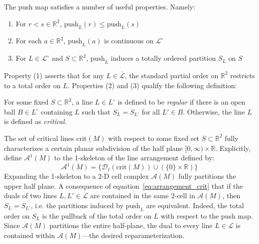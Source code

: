 \documentclass{siamart190516}
\begin{document}
The push map satisfies a number of useful properties. Namely: 
\begin{enumerate}
	\item For $r < s \in \mathbb{R}^2$, $\mathrm{push}_L(r) \leq \mathrm{push}_L(s)$
	\item For each $a \in \mathbb{R}^2$, $\mathrm{push}_L(a)$ is continuous on $\mathcal{L}^\circ$
	\item For $L \in \mathcal{L}^\circ$ and $S \subset \mathbb{R}^2$, $\mathrm{push}_L$ induces a totally ordered partition $S_L$ on $S$ 
\end{enumerate}
Property (1) asserts that for any $L \in \overline{\mathcal{L}}$, the standard partial order on $\mathbb{R}^2$ restricts to a total order on $L$. Properties (2) and (3) qualify the following definition:
\begin{definition}
	For some fixed $S \subset \mathbb{R}^2$, a line $L \in L^\circ$ is defined to be \emph{regular} if there is an open ball $B \in L^\circ$ containing $L$ such that $S_L = S_{L'}$ for all $L' \in B$. Otherwise, the line $L$ is defined as \emph{critical}. 
\end{definition}
\noindent The set of critical lines $\mathrm{crit}(M)$ with respect to some fixed set $S \subset \mathbb{R}^2$ fully characterizes a certain planar subdivision of the half plane $[0, \infty) \times \mathbb{R}$. Explicitly, define $\mathcal{A}^1(M)$ to the 1-skeleton of the line arrangement defined by: 
\begin{equation}\label{eq:arrangement_crit}
	\mathcal{A}^1(M) = \{ \mathcal{D}_{\ell}(\mathrm{crit}(M)) \cup (\{0\} \times \mathbb{R}) \}
\end{equation}
Expanding the 1-skeleton to a 2-D cell complex $\mathcal{A}(M)$ fully partitions the upper half plane.  
A consequence of equation~\ref{eq:arrangement_crit} that if the duals of two lines $L, L' \in \mathcal{L}$ are contained in the same $2$-cell in $\mathcal{A}(M)$, then $S_L = S_{L'}$, i.e. the partitions induced by $\mathrm{push}_L$ are equivalent. Indeed, the total order on $S_L$ is the pullback of the total order on $L$ with respect to the push map.
Since $\mathcal{A}(M)$ partitions the entire half-plane, the dual to every line $L \in \mathcal{L}$ is contained within $\mathcal{A}(M)$---the desired reparameterization. 
\end{document}
